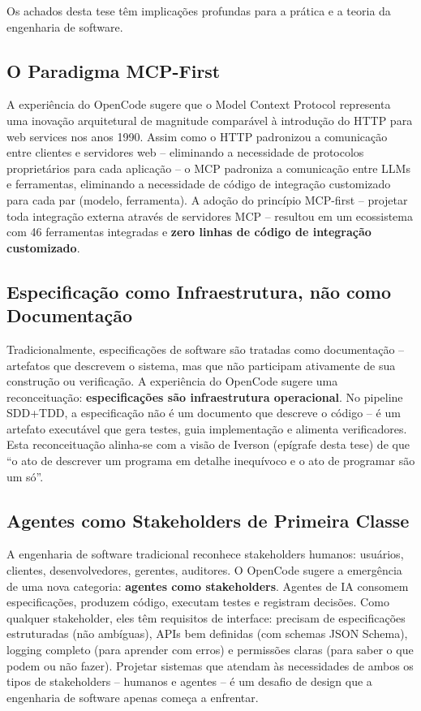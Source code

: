 \documentclass[12pt,a4paper,sumario=tradicional,openany]{abntex2}
\begin{document}
Os achados desta tese têm implicações profundas para a prática e a teoria da engenharia de software.

\subsection{O Paradigma MCP-First}

A experiência do OpenCode sugere que o Model Context Protocol representa uma inovação arquitetural de magnitude comparável à introdução do HTTP para web services nos anos 1990. Assim como o HTTP padronizou a comunicação entre clientes e servidores web -- eliminando a necessidade de protocolos proprietários para cada aplicação -- o MCP padroniza a comunicação entre LLMs e ferramentas, eliminando a necessidade de código de integração customizado para cada par (modelo, ferramenta). A adoção do princípio MCP-first -- projetar toda integração externa através de servidores MCP -- resultou em um ecossistema com 46 ferramentas integradas e \textbf{zero linhas de código de integração customizado}.

\subsection{Especificação como Infraestrutura, não como Documentação}

Tradicionalmente, especificações de software são tratadas como documentação -- artefatos que descrevem o sistema, mas que não participam ativamente de sua construção ou verificação. A experiência do OpenCode sugere uma reconceituação: \textbf{especificações são infraestrutura operacional}. No pipeline SDD+TDD, a especificação não é um documento que descreve o código -- é um artefato executável que gera testes, guia implementação e alimenta verificadores. Esta reconceituação alinha-se com a visão de Iverson (epígrafe desta tese) de que ``o ato de descrever um programa em detalhe inequívoco e o ato de programar são um só''.

\subsection{Agentes como Stakeholders de Primeira Classe}

A engenharia de software tradicional reconhece stakeholders humanos: usuários, clientes, desenvolvedores, gerentes, auditores. O OpenCode sugere a emergência de uma nova categoria: \textbf{agentes como stakeholders}. Agentes de IA consomem especificações, produzem código, executam testes e registram decisões. Como qualquer stakeholder, eles têm requisitos de interface: precisam de especificações estruturadas (não ambíguas), APIs bem definidas (com schemas JSON Schema), logging completo (para aprender com erros) e permissões claras (para saber o que podem ou não fazer). Projetar sistemas que atendam às necessidades de ambos os tipos de stakeholders -- humanos e agentes -- é um desafio de design que a engenharia de software apenas começa a enfrentar.
\end{document}
